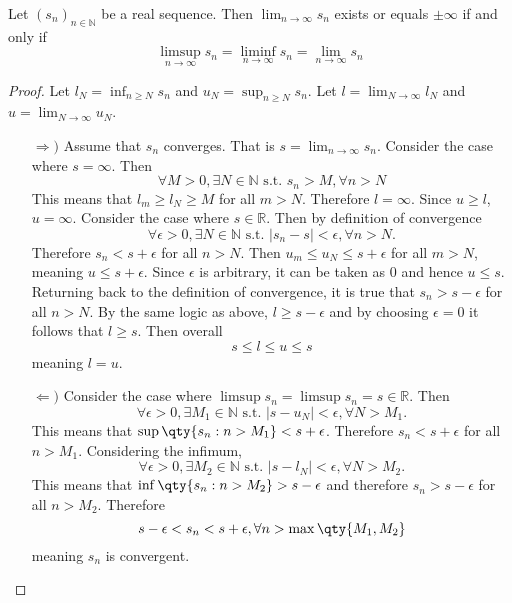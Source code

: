 \documentclass[../notes.tex]{subfiles}
\begin{document}
\begin{theorem}
    Let $(s_n)_{n\in \mathbb{N}}$ be a real sequence. Then $\lim_{n \to \infty} s_n$ exists or equals $\pm \infty$ if and only if
    \[
        \limsup_{n\to \infty} s_n = \liminf_{n\to \infty} s_n = \lim_{n\to \infty} s_n
    \]
\end{theorem}
\begin{proof}
    Let $l_N = \inf_{n \geq N} s_n$ and $u_N = \sup_{n \geq N} s_n$. Let $l = \lim_{N\to \infty} l_N$ and $u = \lim_{N \to \infty} u_N$.
    \begin{enumerate}
        \item[$\Rightarrow)$]
        Assume that $s_n$ converges. That is $s = \lim_{n\to \infty} s_n$. Consider the case where $s = \infty$. Then
        \[
            \forall M > 0, \exists N \in \mathbb{N} \text{ s.t. } s_n > M, \forall n > N
        \]
        This means that $l_m \geq l_N \geq M$ for all $m > N$. Therefore $l = \infty$. Since $u \geq l$, $u = \infty$. Consider the case where $s \in \mathbb{R}$. Then by definition of convergence
        \[
            \forall \epsilon > 0, \exists N \in \mathbb{N} \text{ s.t. } |s_n - s| < \epsilon, \forall n > N.
        \]
        Therefore $s_n < s + \epsilon$ for all $n > N$. Then $u_m \leq u_N \leq s + \epsilon$ for all $m > N$, meaning $u \leq s + \epsilon$. Since $\epsilon$ is arbitrary, it can be taken as $0$ and hence $u \leq s$. Returning back to the definition of convergence, it is true that $s_n > s - \epsilon$ for all $n > N$. By the same logic as above, $l \geq s - \epsilon$ and by choosing $\epsilon = 0$ it follows that $l \geq s$. Then overall
        \[
            s \leq l \leq u \leq s
        \]
        meaning $l = u$.
        \item[$\Leftarrow)$]
        Consider the case where $\limsup s_n = \limsup s_n = s \in \mathbb{R}$. Then
        \[
            \forall \epsilon > 0, \exists M_1 \in \mathbb{N} \text{ s.t. } |s - u_N| < \epsilon, \forall N > M_1.
        \]
        This means that $\sup\qty{s_n : n > M_1} < s + \epsilon$. Therefore $s_n < s + \epsilon$ for all $n > M_1$. Considering the infimum,
        \[
            \forall \epsilon > 0, \exists M_2 \in \mathbb{N} \text{ s.t. } |s - l_N| < \epsilon, \forall N > M_2.
        \]
        This means that $\inf\qty{s_n : n > M_2} > s - \epsilon$ and therefore $s_n > s - \epsilon$ for all $n > M_2$. Therefore
        \[
            s - \epsilon < s_n < s + \epsilon, \forall n > \max\qty{M_1, M_2}
        \]
        meaning $s_n$ is convergent.
    \end{enumerate}
\end{proof}
\end{document}
